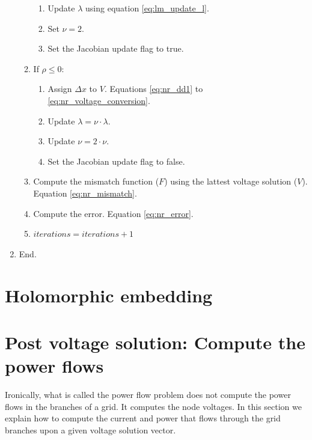 \documentclass{tufte-book}
\begin{document}
\begin{enumerate}
\begin{enumerate}
\begin{enumerate}
		\item Update $\lambda$ using equation \ref{eq:lm_update_l}.
		
		\item Set $\nu = 2$.
		
		\item Set the Jacobian update flag to true.
		\end{enumerate}
		
	\item If $\rho \leq 0$:
	
		\begin{enumerate}
		\item Assign $\Delta x$ to $V$. Equations \ref{eq:nr_dd1} to \ref{eq:nr_voltage_conversion}.
		
		\item Update $\lambda = \nu \cdot \lambda$.
		
		\item Update $\nu = 2 \cdot \nu$.
		
		\item Set the Jacobian update flag to false.
		\end{enumerate}
	
	\item Compute the mismatch function ($F$) using the lattest voltage solution ($V$). Equation \ref{eq:nr_mismatch}.
	
	\item Compute the error. Equation \ref{eq:nr_error}.
	
	\item $iterations = iterations + 1$
	\end{enumerate}

\item End.
\end{enumerate}



\section{Holomorphic embedding}


\section{Post voltage solution: Compute the power flows}

Ironically, what is called the power flow problem does not compute the power flows in the branches of a grid. It computes the node voltages. In this section we explain how to compute the current and power that flows through the grid branches upon a given voltage solution vector.
\end{document}
